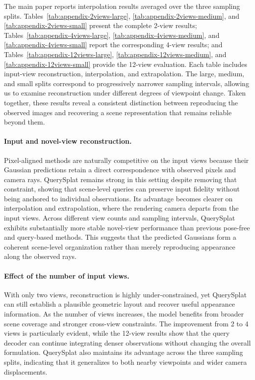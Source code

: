 The main paper reports interpolation results averaged over the three sampling splits. Tables~\ref{tab:appendix-2views-large}, \ref{tab:appendix-2views-medium}, and \ref{tab:appendix-2views-small} present the complete 2-view results; Tables~\ref{tab:appendix-4views-large}, \ref{tab:appendix-4views-medium}, and \ref{tab:appendix-4views-small} report the corresponding 4-view results; and Tables~\ref{tab:appendix-12views-large}, \ref{tab:appendix-12views-medium}, and \ref{tab:appendix-12views-small} provide the 12-view evaluation. Each table includes input-view reconstruction, interpolation, and extrapolation. The large, medium, and small splits correspond to progressively narrower sampling intervals, allowing us to examine reconstruction under different degrees of viewpoint change. Taken together, these results reveal a consistent distinction between reproducing the observed images and recovering a scene representation that remains reliable beyond them.

\paragraph{Input and novel-view reconstruction.}
Pixel-aligned methods are naturally competitive on the input views because their Gaussian predictions retain a direct correspondence with observed pixels and camera rays. QuerySplat remains strong in this setting despite removing that constraint, showing that scene-level queries can preserve input fidelity without being anchored to individual observations. Its advantage becomes clearer on interpolation and extrapolation, where the rendering camera departs from the input views. Across different view counts and sampling intervals, QuerySplat exhibits substantially more stable novel-view performance than previous pose-free and query-based methods. This suggests that the predicted Gaussians form a coherent scene-level organization rather than merely reproducing appearance along the observed rays.

\paragraph{Effect of the number of input views.}
With only two views, reconstruction is highly under-constrained, yet QuerySplat can still establish a plausible geometric layout and recover useful appearance information. As the number of views increases, the model benefits from broader scene coverage and stronger cross-view constraints. The improvement from 2 to 4 views is particularly evident, while the 12-view results show that the query decoder can continue integrating denser observations without changing the overall formulation. QuerySplat also maintains its advantage across the three sampling splits, indicating that it generalizes to both nearby viewpoints and wider camera displacements.

